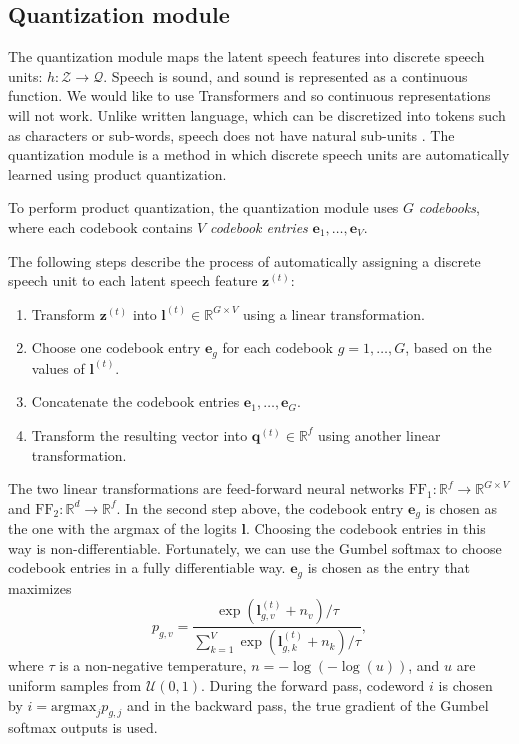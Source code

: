 \subsection{Quantization module}
The quantization module maps the latent speech features into discrete speech units: $h: \mathcal{Z} \rightarrow \mathcal{Q}$.
Speech is sound, and sound is represented as a continuous function. We would like to use Transformers and so continuous representations will not work. 
Unlike written language, which can be discretized into tokens such as characters or sub-words, speech does not have natural sub-units \cite{bgn2021illustrated}. 
The quantization module is a method in which discrete speech units are automatically learned using product quantization.

To perform product quantization, the quantization module uses $G$ \emph{codebooks}, where each codebook contains $V$ \emph{codebook entries} $\mathbf{e}_{1}, \dots, \mathbf{e}_{V}$.

The following steps describe the process of automatically assigning a discrete speech unit to each latent speech feature $\mathbf{z}^{(t)}$:
\begin{enumerate}
    \item Transform $\mathbf{z}^{(t)}$ into $\mathbf{l}^{(t)} \in \mathbb{R}^{G \times V}$ using a linear transformation.
    \item Choose one codebook entry $\mathbf{e}_g$ for each codebook $g = 1, \dots, G$, based on the values of $\mathbf{l}^{(t)}$.
    \item Concatenate the codebook entries $\mathbf{e}_1, \dots, \mathbf{e}_G$.
    \item Transform the resulting vector into $\mathbf{q}^{(t)} \in \mathbb{R}^{f}$ using another linear transformation.
\end{enumerate}
The two linear transformations are feed-forward neural networks $\text{FF}_1: \mathbb{R}^{f} \rightarrow \mathbb{R}^{G \times V}$ and $\text{FF}_2: \mathbb{R}^{d} \rightarrow \mathbb{R}^{f}$.
In the second step above, the codebook entry $\mathbf{e}_g$ is chosen as the one with the argmax of the logits $\mathbf{l}$. Choosing the codebook entries in this way is non-differentiable.
Fortunately, we can use the Gumbel softmax to choose codebook entries in a fully differentiable way. 
$\mathbf{e}_g$ is chosen as the entry that maximizes
\begin{equation}
    p_{g, v} = \dfrac{\exp{\left(\mathbf{l}^{(t)}_{g, v} + n_v\right)}/\tau}{\sum\limits_{k=1}^{V} \exp{\left(\mathbf{l}^{(t)}_{g, k} + n_k\right)}/\tau},
\end{equation}
where $\tau$ is a non-negative temperature, $n = -\log{(-\log{(u)})}$, and $u$ are uniform samples from $\mathcal{U}(0, 1)$.
During the forward pass, codeword $i$ is chosen by $i = \text{argmax}_j p_{g,j}$ and in the backward pass, the true gradient of the Gumbel softmax outputs is used.



